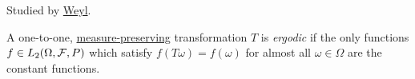 
Studied by \href{https://en.wikipedia.org/wiki/Hermann_Weyl}{Weyl}.
\begin{definition}\label{def:ergodic-transformation}
	A one-to-one, \hyperref[def:measure-preserving]{measure-preserving} transformation \(T\) is \emph{ergodic} if the only functions \(f\in L_2 (\Omega , \mathcal{\MakeUppercase{f}} , P)\) which satisfy \(f(T \omega ) = f(\omega )\) for almost all \(\omega \in \Omega \) are the constant functions.
\end{definition}